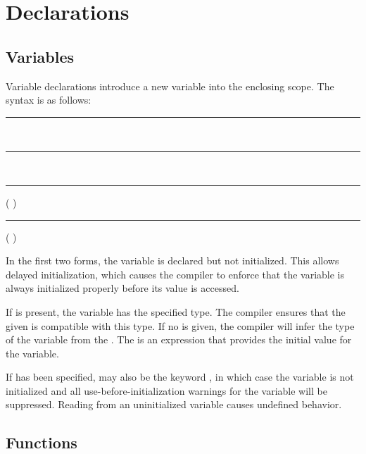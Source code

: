 
\chapter{Declarations}

\section{Variables}

Variable declarations introduce a new variable into the enclosing scope. The
syntax is as follows:

\begin{grammar}
\rule{immutable-variable-declaration}   \code{:}  \code{;}\\
\rule{mutable-variable-declaration}   \code{:}  \code{;}\\
\rule{immutable-variable-definition}   (\code{:} )\optional{} \code{=}  \code{;}\\
\rule{mutable-variable-definition}   (\code{:} )\optional{} \code{=}  \code{;}
\end{grammar}

In the first two forms, the variable is declared but not initialized. This
allows delayed initialization, which causes the compiler to enforce that the
variable is always initialized properly before its value is accessed.

If  is present, the variable has the specified type. The
compiler ensures that the given  is compatible with
this type. If no  is given, the compiler will infer the type
of the variable from the . The
 is an expression that provides the initial value for
the variable.

If  has been specified,  may also be
the keyword , in which case the variable is not initialized and
all use-before-initialization warnings for the variable will be suppressed.
Reading from an uninitialized variable causes undefined behavior.

\section{Functions}

